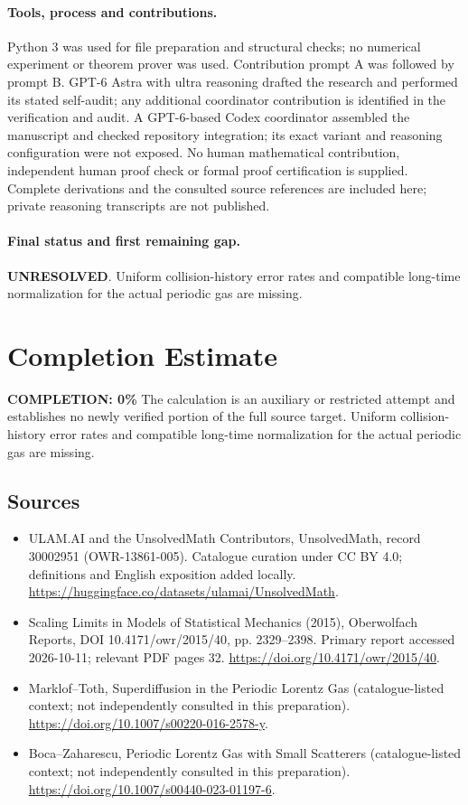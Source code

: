 \documentclass[11pt]{article}
\begin{document}
\paragraph{Tools, process and contributions.}
Python 3 was used for file preparation and structural checks; no numerical experiment or theorem prover was used. Contribution prompt A was followed by prompt B. GPT-6 Astra with ultra reasoning drafted the research and performed its stated self-audit; any additional coordinator contribution is identified in the verification and audit. A GPT-6-based Codex coordinator assembled the manuscript and checked repository integration; its exact variant and reasoning configuration were not exposed. No human mathematical contribution, independent human proof check or formal proof certification is supplied. Complete derivations and the consulted source references are included here; private reasoning transcripts are not published.

\paragraph{Final status and first remaining gap.}
\textbf{UNRESOLVED}. Uniform collision-history error rates and compatible long-time normalization for the actual periodic gas are missing.

\section{Completion Estimate}
\noindent\textbf{COMPLETION: 0\%}
The calculation is an auxiliary or restricted attempt and establishes no newly verified portion of the full source target. Uniform collision-history error rates and compatible long-time normalization for the actual periodic gas are missing.

\subsection{Sources}
\begin{itemize}
\item[\hypertarget{source:30002951:1}{S1}] ULAM.AI and the UnsolvedMath Contributors, UnsolvedMath, record 30002951 (OWR-13861-005). Catalogue curation under CC BY 4.0; definitions and English exposition added locally.
\url{https://huggingface.co/datasets/ulamai/UnsolvedMath}.
\item[\hypertarget{source:30002951:2}{S2}] Scaling Limits in Models of Statistical Mechanics (2015), Oberwolfach Reports, DOI 10.4171/owr/2015/40, pp. 2329--2398. Primary report accessed 2026-10-11; relevant PDF pages 32.
\url{https://doi.org/10.4171/owr/2015/40}.
\item[\hypertarget{source:30002951:3}{S3}] Marklof--Toth, Superdiffusion in the Periodic Lorentz Gas (catalogue-listed context; not independently consulted in this preparation).
\url{https://doi.org/10.1007/s00220-016-2578-y}.
\item[\hypertarget{source:30002951:4}{S4}] Boca--Zaharescu, Periodic Lorentz Gas with Small Scatterers (catalogue-listed context; not independently consulted in this preparation).
\url{https://doi.org/10.1007/s00440-023-01197-6}.
\end{itemize}
\label{end:30002951}
\end{document}
